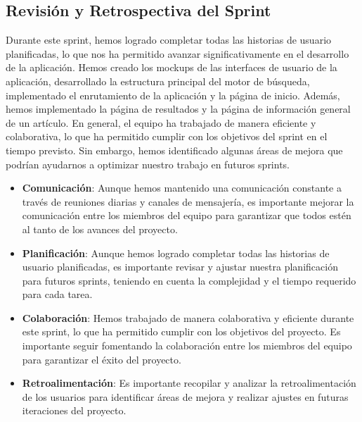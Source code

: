 \subsection{Revisión y Retrospectiva del Sprint}
Durante este sprint, hemos logrado completar todas las historias de usuario planificadas, lo que nos ha permitido avanzar significativamente en el desarrollo de la aplicación.
Hemos creado los mockups de las interfaces de usuario de la aplicación, desarrollado la estructura principal del motor de búsqueda, implementado el enrutamiento de la aplicación y la página de inicio.
Además, hemos implementado la página de resultados y la página de información general de un artículo.
En general, el equipo ha trabajado de manera eficiente y colaborativa, lo que ha permitido cumplir con los objetivos del sprint en el tiempo previsto.
Sin embargo, hemos identificado algunas áreas de mejora que podrían ayudarnos a optimizar nuestro trabajo en futuros sprints.
\begin{itemize}
    \item \textbf{Comunicación}: Aunque hemos mantenido una comunicación constante a través de reuniones diarias y canales de mensajería, es importante mejorar la comunicación entre los miembros del equipo para garantizar que todos estén al tanto de los avances del proyecto.
    \item \textbf{Planificación}: Aunque hemos logrado completar todas las historias de usuario planificadas, es importante revisar y ajustar nuestra planificación para futuros sprints, teniendo en cuenta la complejidad y el tiempo requerido para cada tarea.
    \item \textbf{Colaboración}: Hemos trabajado de manera colaborativa y eficiente durante este sprint, lo que ha permitido cumplir con los objetivos del proyecto. Es importante seguir fomentando la colaboración entre los miembros del equipo para garantizar el éxito del proyecto.
    \item \textbf{Retroalimentación}: Es importante recopilar y analizar la retroalimentación de los usuarios para identificar áreas de mejora y realizar ajustes en futuras iteraciones del proyecto.
\end{itemize}